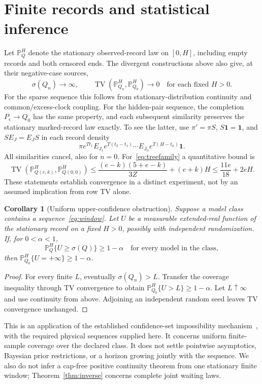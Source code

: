 \documentclass[aps,pre,onecolumn,11pt,longbibliography,notitlepage]{revtex4-2}
\newtheorem{corollary}[theorem]{Corollary}
\newcommand{\1}{\mathbf 1}
\newcommand{\TV}{\operatorname{TV}}
\newcommand{\sig}{\sigma}
\begin{document}
\section{Finite records and statistical inference}\label{sec:records}
Let $\mathbb P_{Q}^{H}$ denote the stationary observed-record law on $[0,H]$, including empty records and both censored ends. The divergent constructions above also give, at their negative-case sources,
\begin{equation}
 \sig(Q_n)\to\infty,\qquad\TV(\mathbb P_{Q_n}^{H},\mathbb P_{Q_0}^{H})\to0
 \quad\text{for each fixed }H>0.\label{eq:window}
\end{equation}
For the sparse sequence this follows from stationary-distribution continuity and common/excess-clock coupling. For the hidden-pair sequence, the completion $P_\epsilon\to Q_0$ has the same property, and each subsequent similarity preserves the stationary marked-record law exactly. To see the latter, use $\pi'=\pi S$, $S\1=\1$, and $SE_J=E_JS$ in each record density
\begin{equation}
 \pi e^{Tt_1}E_{J_1}e^{T(t_2-t_1)}\cdots E_{J_n}e^{T(H-t_n)}\1.\label{eq:likelihood}
\end{equation}
All similarities cancel, also for $n=0$. For~\eqref{eq:treefamily} a quantitative bound is
\begin{equation}
 \TV(\mathbb P_{Q(e,k)}^{H},\mathbb P_{Q(0,0)}^{H})
 \le\frac{(e-k)(5+e-k)}{3Z}+(e+k)H
 \le\frac{11e}{18}+2eH.\label{eq:windowtree}
\end{equation}
These statements establish convergence in a distinct experiment, not by an assumed implication from row TV alone.

\begin{corollary}[Uniform upper-confidence obstruction]\label{cor:confidence}
Suppose a model class contains a sequence~\eqref{eq:window}. Let $U$ be a measurable extended-real function of the stationary record on a fixed $H>0$, possibly with independent randomization. If, for $0<\alpha<1$,
\begin{equation}
 \mathbb P_Q^H\{U\ge\sig(Q)\}\ge1-\alpha\quad\text{for every model in the class},
\end{equation}
then $\mathbb P_{Q_0}^H\{U=+\infty\}\ge1-\alpha$.
\end{corollary}
\begin{proof}
For every finite $L$, eventually $\sig(Q_n)>L$. Transfer the coverage inequality through TV convergence to obtain $\mathbb P_{Q_0}^H\{U>L\}\ge1-\alpha$. Let $L\uparrow\infty$ and use continuity from above. Adjoining an independent random seed leaves TV convergence unchanged.
\end{proof}
This is an application of the established confidence-set impossibility mechanism~\cite{Moss2022}, with the required physical sequences supplied here. It concerns uniform finite-sample coverage over the declared class. It does not settle pointwise asymptotics, Bayesian prior restrictions, or a horizon growing jointly with the sequence. We also do not infer a cap-free positive continuity theorem from one stationary finite window; Theorem~\ref{thm:inverse} concerns complete joint waiting laws.
\end{document}
